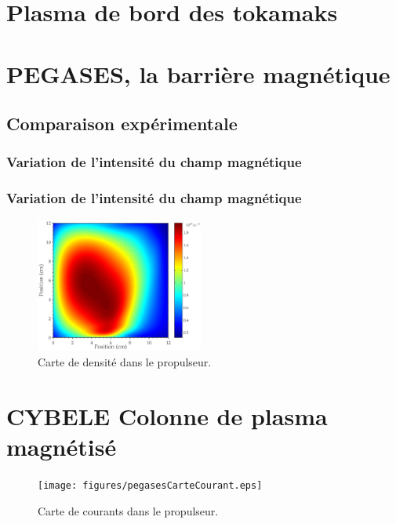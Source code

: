 \begin{refsection}

	\section{Plasma de bord des tokamaks}
		 
	\section{PEGASES, la barrière magnétique}
		\subsection{Comparaison expérimentale}
			
			\subsubsection{Variation de l'intensité du champ magnétique}
			\subsubsection{Variation de l'intensité du champ magnétique}
\begin{figure}[htbp]
\centering
\includegraphics[width=5.5cm]{figures/pegasescarteDensite.eps}
{\caption{Carte de densité dans le propulseur.} \label{4-pegasesDensite}}
\end{figure}
	
	\section{CYBELE Colonne de plasma magnétisé}
	\begin{figure}[htbp]
	\texttt{[image: figures/pegasesCarteCourant.eps]}{
	\caption{Carte de courants dans le propulseur.} \label{4-pegasesCourants}}
\end{figure}
		

%
%
\end{refsection}

